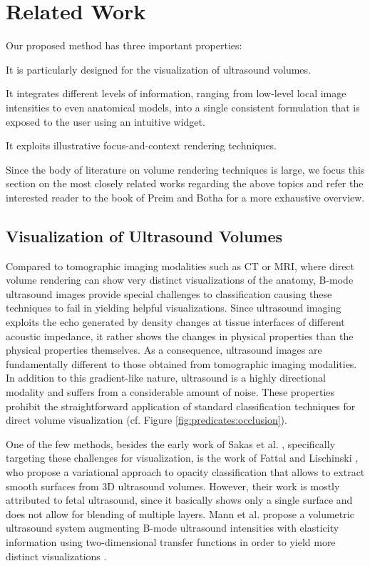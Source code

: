 \section*{Related Work}
\label{sec:predicates:related_work}

Our proposed method has three important properties:
\begin{my_list_num}
	\item It is particularly designed for the visualization of ultrasound volumes. 
	\item It integrates different levels of information, ranging from low-level local image intensities to even anatomical models, into a single consistent formulation that is exposed to the user using an intuitive widget. 
	\item It exploits illustrative focus-and-context rendering techniques. 
\end{my_list_num}

Since the body of literature on volume rendering techniques is large, we focus this section on the most closely related works regarding the above topics and refer the interested reader to the book of Preim and Botha \cite{Preim13} for a more exhaustive overview. 

\subsection{Visualization of Ultrasound Volumes}
\label{sec:predicates:related_work:us}

Compared to tomographic imaging modalities such as CT or MRI, where direct volume rendering can show very distinct visualizations of the anatomy, B-mode ultrasound images provide special challenges to classification causing these techniques to fail in yielding helpful visualizations. 
Since ultrasound imaging exploits the echo generated by density changes at tissue interfaces of different acoustic impedance, it rather shows the changes in physical properties than the physical properties themselves. 
As a consequence, ultrasound images are fundamentally different to those obtained from tomographic imaging modalities. 
In addition to this gradient-like nature, ultrasound is a highly directional modality and suffers from a considerable amount of noise. 
These properties prohibit the straightforward application of standard classification techniques for direct volume visualization (cf. Figure \ref{fig:predicates:occlusion}).

One of the few methods, besides the early work of Sakas et al. \cite{Sakas95}, specifically targeting these challenges for visualization, is the work of Fattal and Lischinski \cite{Fattal01}, who propose a variational approach to opacity classification that allows to extract smooth surfaces from 3D ultrasound volumes. 
However, their work is mostly attributed to fetal ultrasound, since it basically shows only a single surface and does not allow for blending of multiple layers. 
Mann et al. propose a volumetric ultrasound system augmenting B-mode ultrasound intensities with elasticity information using two-dimensional transfer functions in order to yield more distinct visualizations \cite{Mann11}. 

